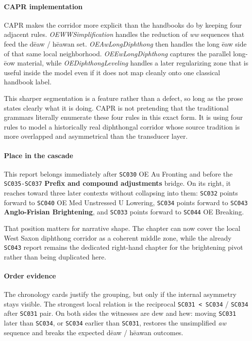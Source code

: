 \documentclass[
  british,
  a4paper,
]{article}
\begin{document}
\paragraph{CAPR implementation}\label{capr-implementation-22}

CAPR makes the corridor more explicit than the handbooks do by keeping
four adjacent rules. \emph{OEWWSimplification} handles the reduction of
\emph{ww} sequences that feed the dēaw / hēawan set.
\emph{OEAwLongDiphthong} then handles the long ēaw side of that same
local neighborhood. \emph{OEEwLongDiphthong} captures the parallel
long-ēow material, while \emph{OEDiphthongLeveling} handles a later
regularizing zone that is useful inside the model even if it does not
map cleanly onto one classical handbook label.

This sharper segmentation is a feature rather than a defect, so long as
the prose states clearly what it is doing. CAPR is not pretending that
the traditional grammars literally enumerate these four rules in this
exact form. It is using four rules to model a historically real
diphthongal corridor whose source tradition is more overlapped and
asymmetrical than the transducer layer.

\paragraph{Place in the cascade}\label{place-in-the-cascade-22}

This report belongs immediately after \texttt{SC030} OE Au Fronting and
before the \texttt{SC035-SC037} \textbf{Prefix and compound adjustments}
bridge. On its right, it reaches toward three later contexts without
collapsing into them: \texttt{SC032} points forward to \texttt{SC040} OE
Med Unstressed U Lowering, \texttt{SC034} points forward to
\texttt{SC043} \textbf{Anglo-Frisian Brightening}, and \texttt{SC033}
points forward to \texttt{SC044} OE Breaking.

That position matters for narrative shape. The chapter can now cover the
local West Saxon diphthong corridor as a coherent middle zone, while the
already \texttt{SC043} report remains the dedicated right-hand chapter
for the brightening pivot rather than being duplicated here.

\paragraph{Order evidence}\label{order-evidence-22}

The chronology cards justify the grouping, but only if the internal
asymmetry stays visible. The strongest local relation is the reciprocal
\texttt{SC031\ \textless{}\ SC034} / \texttt{SC034} after \texttt{SC031}
pair. On both sides the witnesses are dew and hew: moving \texttt{SC031}
later than \texttt{SC034}, or \texttt{SC034} earlier than
\texttt{SC031}, restores the unsimplified \emph{aw} sequence and breaks
the expected dēaw / hēawan outcomes.
\end{document}
